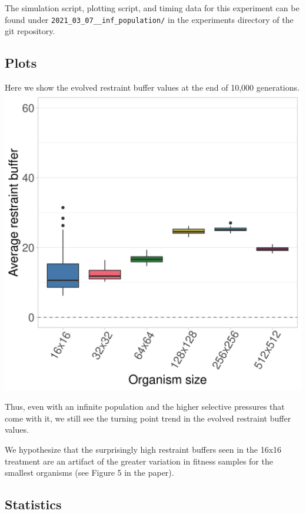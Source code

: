 \documentclass[
]{book}
\begin{document}
The simulation script, plotting script, and timing data for this experiment can be found under \texttt{2021\_03\_07\_\_inf\_population/} in the experiments directory of the git repository.

\hypertarget{plots}{%
\subsection{Plots}\label{plots}}

Here we show the evolved restraint buffer values at the end of 10,000 generations.
\includegraphics{./inf_pop/evolved_boxplots.png}

Thus, even with an infinite population and the higher selective pressures that come with it, we still see the turning point trend in the evolved restraint buffer values.

We hypothesize that the surprisingly high restraint buffers seen in the 16x16 treatment are an artifact of the greater variation in fitness samples for the smallest organisms (see Figure 5 in the paper).

\hypertarget{statistics-8}{%
\subsection{Statistics}\label{statistics-8}}
\end{document}
